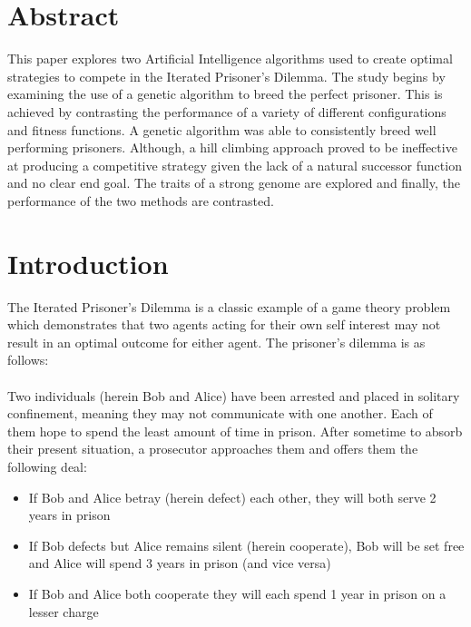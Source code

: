 \documentclass[12pt]{article}
\begin{document}
\maketitle

\pagebreak
\tableofcontents
\pagebreak

\section{Abstract}

This paper explores two Artificial Intelligence algorithms used
to create optimal strategies to compete in the Iterated Prisoner's Dilemma. The
study begins by examining the use of a genetic algorithm to breed the perfect
prisoner. This is achieved by contrasting the performance of a variety of different configurations and fitness functions.  A genetic algorithm was able to
consistently breed well performing prisoners. 
Although, a hill climbing approach proved to be ineffective at producing a competitive strategy given the
lack of a natural successor function and no clear end goal.  The traits
of a strong genome are explored and finally, the performance of the two methods are contrasted.

\pagebreak

\section{Introduction}
The Iterated Prisoner's Dilemma is a classic example of a game theory problem which demonstrates
that two agents acting for their own self interest may not result in an
optimal outcome for either agent.  The prisoner's
dilemma is as follows: \\ \\
Two individuals (herein Bob and Alice) have been arrested and placed in solitary
confinement, meaning they may not communicate with one another.  Each of them hope
to spend the least amount of time in prison.  After sometime to absorb their present situation, a prosecutor approaches them
and offers them the following deal:
\begin{itemize}
    \item If Bob and Alice betray (herein defect) each other, they will
        both serve 2 years in prison
    \item If Bob defects but Alice remains silent (herein cooperate), Bob
        will be set free and Alice will spend 3 years in prison (and vice versa)
    \item If Bob and Alice both cooperate they will each spend 1 year in prison
        on a lesser charge \\
\end{itemize}
\end{document}
